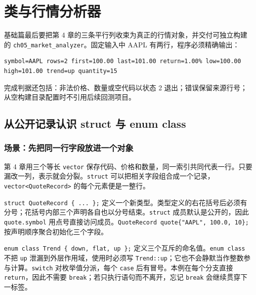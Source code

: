 \chapter{类与行情分析器}


基础篇最后要把第 4 章的三条平行列收束为真正的行情对象，并交付可独立构建的 \texttt{ch05\_market\_analyzer}。固定输入中 AAPL 有两行，程序必须精确输出：

\begin{lstlisting}
symbol=AAPL rows=2 first=100.00 last=101.00 return=1.00% low=100.00 high=101.00 trend=up quantity=15
\end{lstlisting}

完成判据还包括：非法价格、数量或空代码以状态 2 退出；错误保留来源行号；从空构建目录配置时不引用后续回测项目。

\section{从公开记录认识 struct 与 enum class}

\subsection{场景：先把同一行字段放进一个对象}

第 4 章用三个等长 \texttt{vector} 保存代码、价格和数量，同一索引共同代表一行。只要漏改一列，表示就会分裂。\texttt{struct} 可以把相关字段组合成一个记录，\texttt{vector<QuoteRecord>} 的每个元素便是一整行。



\texttt{struct QuoteRecord \{ ... \};} 定义一个新类型。类型定义的右花括号后必须有分号；花括号内部三个声明各自也以分号结束。\texttt{struct} 成员默认是公开的，因此 \texttt{quote.symbol} 用点号直接访问成员。\texttt{QuoteRecord quote\{"AAPL", 100.0, 10\};} 按声明顺序聚合初始化三个字段。

\texttt{enum class Trend \{ down, flat, up \};} 定义三个互斥的命名值。\texttt{enum class} 不把 \texttt{up} 泄漏到外层作用域，使用时必须写 \texttt{Trend::up}；它也不会静默当作整数参与计算。\texttt{switch} 对枚举值分派，每个 \texttt{case} 后有冒号。本例在每个分支直接 \texttt{return}，因此不需要 \texttt{break}；若只执行语句而不离开，忘记 \texttt{break} 会继续贯穿下一标签。


